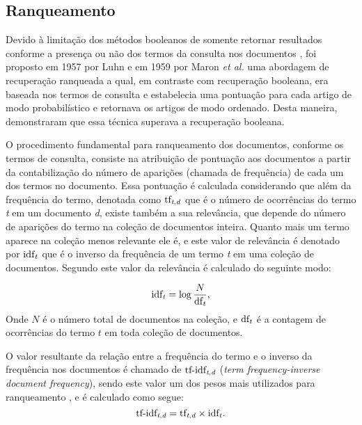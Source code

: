 \subsection{Ranqueamento} \label{subsec:Ranqueamento}
    Devido à limitação dos métodos booleanos de somente retornar resultados conforme a presença ou não dos termos da consulta nos documentos \cite[p.~100]{Manning2008IIR}, foi proposto em 1957 por Luhn e em 1959 por Maron \textit{et al.} uma abordagem de recuperação ranqueada \cite[p.~1446]{Sanderson2012THIRR} a qual, em contraste com recuperação booleana, era baseada nos termos de consulta e estabelecia uma pontuação para cada artigo de modo probabilístico e retornava os artigos de modo ordenado.
    Desta maneira, demonstraram que essa técnica superava a recuperação booleana.
    
    O procedimento fundamental para ranqueamento dos documentos, conforme os termos de consulta, consiste na atribuição de pontuação aos documentos a partir da contabilização do número de aparições (chamada de frequência) de cada um dos termos no documento.
    Essa pontuação é calculada considerando que além da frequência do termo, denotada como $\text{tf}_{\text{\textit{t},\textit{d}}}$ que é o número de ocorrências do termo \textit{t} em um documento \textit{d}, existe também a sua relevância, que depende do número de aparições do termo na coleção de documentos inteira.
    Quanto mais um termo aparece na coleção menos relevante ele é, e este valor de relevância é denotado por $\text{idf}_{\text{\textit{t}}}$ que é o inverso da frequência de um termo \textit{t} em uma coleção de documentos.
    Segundo  este valor da relevância é calculado do seguinte modo:

    \begin{equation}
        \label{eq:inverse-document-frequency}
        \text{idf}_{\text{\textit{t}}} = \log{\frac{N}{\text{df}_{\text{\textit{t}}}}},
    \end{equation}
    Onde $N$ é o número total de documentos na coleção, e $\text{df}_{\text{\textit{t}}}$ é a contagem de ocorrências do termo $t$ em toda coleção de documentos.
    
    O valor resultante da relação entre a frequência do termo e o inverso da frequência nos documentos é chamado de $\text{tf-idf}_{\text{\textit{t},\textit{d}}}$ (\textit{term frequency-inverse document frequency}), sendo este valor um dos pesos mais utilizados para ranqueamento \cite[p.~107--110]{Manning2008IIR}, e é calculado  como segue:
    \begin{equation}
        \label{eq:tf-idf}
        \text{tf-idf}_{\text{\textit{t},\textit{d}}}  = \text{tf}_{\text{\textit{t},\textit{d}}} \times \text{idf}_{\text{\textit{t}}}.
    \end{equation}
    
